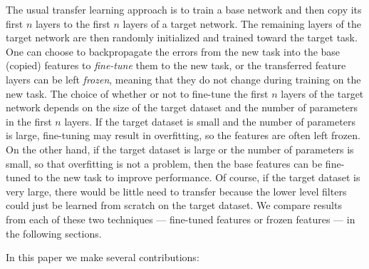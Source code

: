 The usual transfer learning approach is to 
train a base network and then copy its first $n$ layers to the first $n$ layers of a target network. The remaining layers of the target network are then 
randomly initialized and trained toward the target task. One can choose to backpropagate the errors from the new task into the base (copied) features to \emph{fine-tune} them to the new task, or the transferred feature layers can be left \emph{frozen}, meaning that they do not change during training on the new task. The choice of whether or not to fine-tune the first $n$ layers of the target network depends on the size of the target dataset and the number of parameters in the first $n$ layers. If the target dataset is small and the number of parameters is large, fine-tuning may result in overfitting, so the features are often left frozen. On the other hand, if the target dataset is large or the number of parameters is small, so that overfitting is not a problem, then the base features can be fine-tuned to the new task to improve performance. Of course, if the target dataset is very large, there would be little need to transfer because the lower level filters could just be learned from scratch on the target dataset. We compare results from each of these two techniques --- fine-tuned features or frozen features --- in the following sections.

In this paper we make several contributions:

